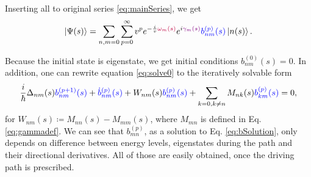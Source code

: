Inserting all to original series \ref{eq:mainSeries}, we get
\begin{equation}
    \ket{\Psi(s)}=\sum_{n,m=0}\sum_{p=0}^\infty v^p e^{-\frac{i}{v}\textcolor{purple}{\omega_m(s)}}e^{i\textcolor{violet}{\gamma_m(s)}}\textcolor{blue}{b_{nm}^{(p)}(s)}\ket{n(s)}.
    \label{eq:solve0}
\end{equation}

Because the initial state is eigenstate, we get initial conditions $b_{nm}^{(0)}(s)=0$. In addition, one can rewrite equation \ref{eq:solve0} to the iteratively solvable form
\begin{equation}
    \frac{i}{\hbar}\Delta_{nm}(s)\textcolor{blue}{b_{nm}^{(p+1)}(s)}+\textcolor{blue}{\dot b_{nm}^{(p)}(s)}+W_{nm}(s) \textcolor{blue}{b_{nm}^{(p)}(s)}+\sum_{k=0,k\neq n}M_{nk}(s)\textcolor{blue}{b_{km}^{(p)}(s)}=0,
    \label{eq:bSolution}
\end{equation}
for $W_{nm}(s)\coloneqq M_{nn}(s)-M_{mm}(s)$, where $M_{mn}$ is defined in Eq. \ref{eq:gammadef}. We can see that $b_{mn}^{(p)}$, as a solution to Eq. \ref{eq:bSolution}, only depends on difference between energy levels, eigenstates during the path and their directional derivatives. All of those are easily obtained, once the driving path is prescribed.

    